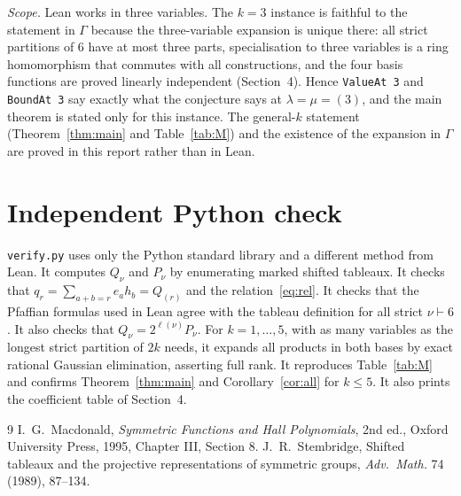\documentclass[11pt]{article}
\theoremstyle{definition}
\theoremstyle{remark}
\begin{document}
\emph{Scope.} Lean works in three variables. The $k=3$ instance is faithful to the
statement in $\Gamma$ because the three-variable expansion is unique there: all strict
partitions of $6$ have at most three parts, specialisation to three variables is a ring
homomorphism that commutes with all constructions, and the four basis functions are proved
linearly independent (Section~4). Hence \texttt{ValueAt 3} and \texttt{BoundAt 3} say exactly
what the conjecture says at $\lambda=\mu=(3)$, and the main theorem is stated only for this
instance. The general-$k$ statement (Theorem~\ref{thm:main} and Table~\ref{tab:M}) and the
existence of the expansion in $\Gamma$ are proved in this report rather than in Lean.

\section{Independent Python check}

\texttt{verify.py} uses only the Python standard library and a different method from Lean.
It computes $Q_\nu$ and $P_\nu$ by enumerating marked shifted tableaux. It checks that
$q_r=\sum_{a+b=r}e_ah_b=Q_{(r)}$ and the relation~\eqref{eq:rel}. It checks that the
Pfaffian formulas used in Lean agree with the tableau definition for all strict
$\nu\vdash6$. It also checks that $Q_\nu=2^{\ell(\nu)}P_\nu$. For $k=1,\dots,5$, with as
many variables as the longest strict partition of $2k$ needs, it expands all products in
both bases by exact rational Gaussian elimination, asserting full rank. It reproduces
Table~\ref{tab:M} and confirms Theorem~\ref{thm:main} and Corollary~\ref{cor:all} for
$k\le5$. It also prints the coefficient table of Section~4.

\begin{thebibliography}{9}
 I.~G.~Macdonald, \emph{Symmetric Functions and Hall Polynomials}, 2nd ed.,
Oxford University Press, 1995, Chapter III, Section 8.
 J.~R.~Stembridge, Shifted tableaux and the projective representations of
symmetric groups, \emph{Adv.\ Math.} 74 (1989), 87--134.
\end{thebibliography}
\end{document}
